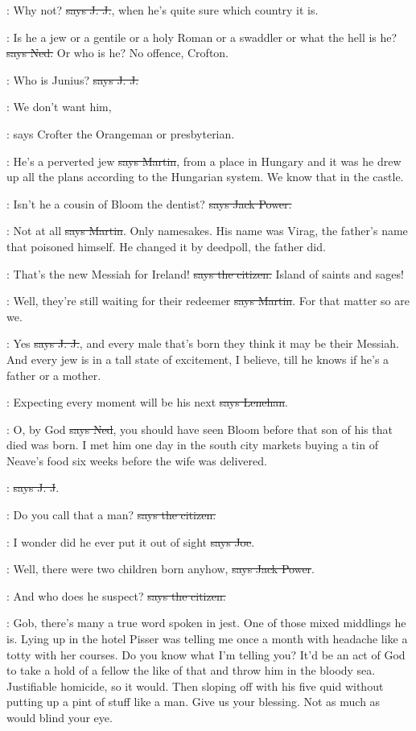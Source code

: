 \jjom:
Why not? \sout{says J. J.},
when he's quite sure which country it is.

\lambert:
Is he a jew or a gentile or a holy Roman
or a swaddler or what the hell
is he? \sout{says Ned.} Or who is he? No offence, Crofton.

\jjom:
Who is Junius? \sout{says J. J.}

\crofton:
We don't want him,

\Nq:
says Crofter the Orangeman or presbyterian.

\cunningham:
He's a perverted jew \sout{says Martin},
from a place in Hungary and it was he
drew up all the plans according to the Hungarian system. We know that in
the castle.

\power:
Isn't he a cousin of Bloom the dentist?
\sout{says Jack Power.}

\cunningham:
Not at all \sout{says Martin}.
Only namesakes. His name was Virag, the
father's name that poisoned himself.
He changed it by deedpoll, the father
did.

\citizen:
That's the new Messiah for Ireland!
\sout{says the citizen.}
Island of saints and sages!

\cunningham:
Well, they're still waiting for their redeemer
\sout{says Martin}. For that
matter so are we.

\jjom:
Yes \sout{says J. J.},
and every male that's born they think it may be their
Messiah. And every jew is in a tall state of excitement, I believe, till
he knows if he's a father or a mother.

\lenehan:
Expecting every moment will be his next
\sout{says Lenehan}.

\lambert:
O, by God \sout{says Ned},
you should have seen Bloom before that son of his
that died was born. I met him one day in the south city markets buying a
tin of Neave's food six weeks before the wife was delivered.

\jjom:
 \sout{says J. J}.

\citizen:
Do you call that a man?
\sout{says the citizen.}

\joe:
I wonder did he ever put it out of sight
\sout{says Joe}.

\power:
Well, there were two children born anyhow,
\sout{says Jack Power}.

\citizen:
And who does he suspect?
\sout{says the citizen.}

\Nq:
Gob, there's many a true word spoken in jest. One of those mixed
middlings he is. Lying up in the hotel Pisser was telling me once a month
with headache like a totty with her courses.
Do you know what I'm telling
you? It'd be an act of God to take a hold of a fellow the like of that and
throw him in the bloody sea. Justifiable homicide, so it would. Then
sloping off with his five quid without putting up a pint of stuff like a
man. Give us your blessing. Not as much as would blind your eye.

